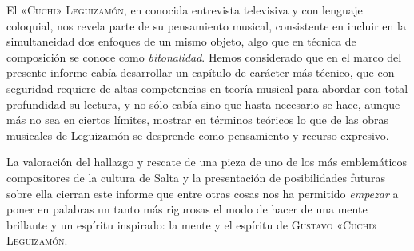 El \textsc{«Cuchi» Leguizamón}, en conocida entrevista televisiva y  con lenguaje coloquial, nos revela parte de su pensamiento musical, consistente en incluir en la simultaneidad dos enfoques de un mismo objeto, algo que en técnica de composición se conoce como \emph{bitonalidad}. Hemos considerado que en el marco del presente informe cabía desarrollar un capítulo de carácter más técnico, que con seguridad requiere de altas competencias en teoría musical para abordar con total profundidad su lectura, y no sólo cabía sino que hasta necesario se hace, aunque más no sea en ciertos límites, mostrar en términos teóricos lo que de las obras musicales de Leguizamón se desprende como pensamiento y recurso expresivo.

La valoración del hallazgo y rescate de una pieza de uno de los más emblemáticos compositores de la cultura de Salta y la presentación de  posibilidades futuras sobre ella cierran este informe que entre otras cosas nos ha permitido \emph{empezar} a poner en palabras un tanto más rigurosas el modo de hacer de una mente brillante y un espíritu inspirado: la mente y el espíritu de \textsc{Gustavo «Cuchi» Leguizamón}.
